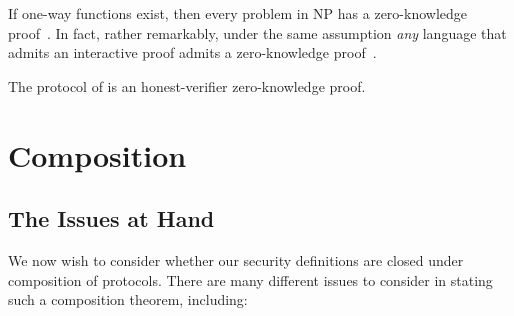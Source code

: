 If one-way functions exist, then every problem in NP has a
zero-knowledge proof~\cite{gmw-1991}. In fact, rather remarkably, under the
same assumption \emph{any} language that admits an interactive proof admits a
zero-knowledge proof~\cite{ben-or-et-al-1990}.

\begin{ex}
  The protocol of 
  is an honest-verifier zero-knowledge proof.
\end{ex}

\section{Composition}
\label{sec:crypto-composition}

\subsection{The Issues at Hand}
\label{sec:composition-issues}

We now wish to consider whether our security definitions are closed under composition
of protocols. There are many different issues to consider in stating such a
composition theorem, including:

